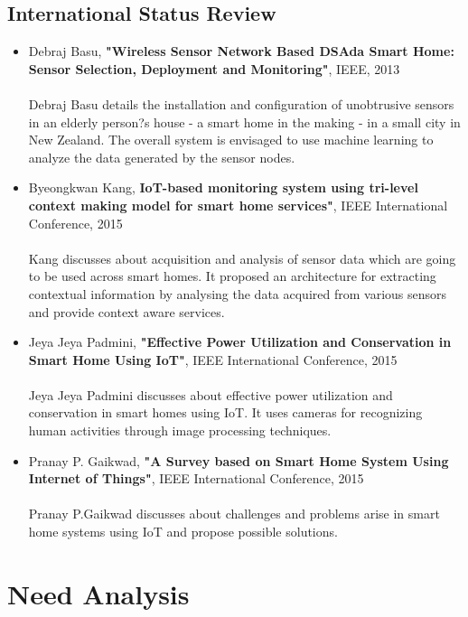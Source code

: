         	\subsection{International Status Review}
        	\begin{itemize}
        		\item Debraj Basu, \textbf{"Wireless Sensor Network Based DSAda Smart Home: Sensor Selection, Deployment and Monitoring"}, IEEE, 2013\\ \\
        		Debraj Basu details the installation and configuration of unobtrusive sensors in an elderly person?s house - a smart home in the making - in a small city in New Zealand. The overall system is envisaged to use machine learning to analyze the data generated by the sensor nodes.
        		\item Byeongkwan Kang, \textbf{IoT-based monitoring system using tri-level context making model for smart home services"}, IEEE International Conference, 2015\\ \\
        		Kang discusses about acquisition and analysis of sensor data which are going to be used across smart homes. It proposed an architecture for extracting contextual information by analysing the data acquired from various sensors and provide context aware services.
        		\item Jeya Jeya Padmini, \textbf{"Effective Power Utilization and Conservation in Smart Home Using IoT"}, IEEE International Conference, 2015\\ \\
        		Jeya Jeya Padmini discusses about effective power utilization and conservation in smart homes using IoT. It uses cameras for recognizing human activities through image processing techniques.
        		\item Pranay P. Gaikwad, \textbf{"A Survey based on Smart Home System Using Internet of Things"}, IEEE International Conference, 2015\\ \\
        		Pranay P.Gaikwad discusses about challenges and problems arise in smart home systems using IoT and propose possible solutions.
        	\end{itemize}
        	
        \section{Need Analysis}
        
